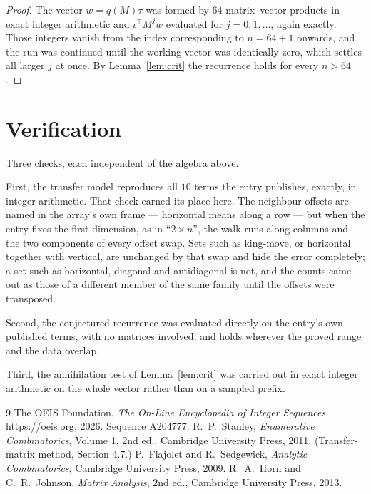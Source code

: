 \documentclass[11pt,a4paper]{article}
\theoremstyle{plain}
\theoremstyle{definition}
\begin{document}
\begin{proof}
The vector $w=q(M)\tau$ was formed by $64$ matrix--vector products in exact integer
arithmetic and $\iota^{\!\top}M^{j}w$ evaluated for $j=0,1,\dots$, again exactly. Those
integers vanish from the index corresponding to $n=64+1$ onwards, and the run was
continued until the working vector was identically zero, which settles all larger $j$ at once.
By Lemma~\ref{lem:crit} the recurrence holds for every $n>64$.
\end{proof}

\section{Verification}

Three checks, each independent of the algebra above.

First, the transfer model reproduces all $10$ terms the entry publishes, exactly, in
integer arithmetic. That check earned its place here. The neighbour offsets are named in the
array's own frame --- horizontal means along a row --- but when the entry fixes the first
dimension, as in ``$2\times n$'', the walk runs along columns and the two components of every
offset swap. Sets such as king-move, or horizontal together with vertical, are unchanged by
that swap and hide the error completely; a set such as horizontal, diagonal and antidiagonal
is not, and the counts came out as those of a different member of the same family until the
offsets were transposed.

Second, the conjectured recurrence was evaluated directly on the entry's own published terms,
with no matrices involved, and holds wherever the proved range and the data overlap.

Third, the annihilation test of Lemma~\ref{lem:crit} was carried out in exact integer
arithmetic on the whole vector rather than on a sampled prefix.

\begin{thebibliography}{9}
 The OEIS Foundation, \emph{The On-Line Encyclopedia of Integer
Sequences}, \url{https://oeis.org}, 2026. Sequence A204777.
 R.~P.~Stanley, \emph{Enumerative Combinatorics}, Volume 1, 2nd ed.,
Cambridge University Press, 2011. (Transfer-matrix method, Section 4.7.)
 P.~Flajolet and R.~Sedgewick, \emph{Analytic Combinatorics}, Cambridge
University Press, 2009.
 R.~A.~Horn and C.~R.~Johnson, \emph{Matrix Analysis}, 2nd ed., Cambridge
University Press, 2013.
\end{thebibliography}
\end{document}
